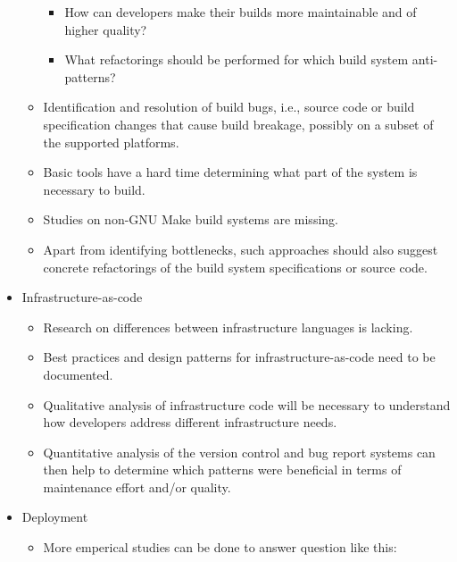 \documentclass[]{book}
\providecommand{\tightlist}{%
  \setlength{\itemsep}{0pt}\setlength{\parskip}{0pt}}
\begin{document}
\begin{itemize}
\begin{itemize}
    \begin{itemize}
    \tightlist
    \item
      How can developers make their builds more maintainable and of
      higher quality?
    \item
      What refactorings should be performed for which build system
      anti-patterns?
    \end{itemize}
  \item
    Identification and resolution of build bugs, i.e., source code or
    build specification changes that cause build breakage, possibly on a
    subset of the supported platforms.
  \item
    Basic tools have a hard time determining what part of the system is
    necessary to build.
  \item
    Studies on non-GNU Make build systems are missing.
  \item
    Apart from identifying bottlenecks, such approaches should also
    suggest concrete refactorings of the build system specifications or
    source code.
  \end{itemize}
\item
  Infrastructure-as-code

  \begin{itemize}
  \tightlist
  \item
    Research on differences between infrastructure languages is lacking.
  \item
    Best practices and design patterns for infrastructure-as-code need
    to be documented.
  \item
    Qualitative analysis of infrastructure code will be necessary to
    understand how developers address different infrastructure needs.
  \item
    Quantitative analysis of the version control and bug report systems
    can then help to determine which patterns were beneficial in terms
    of maintenance effort and/or quality.
  \end{itemize}
\item
  Deployment

  \begin{itemize}
  \tightlist
  \item
    More emperical studies can be done to answer question like this:


\end{itemize}
\end{itemize}
\end{document}
